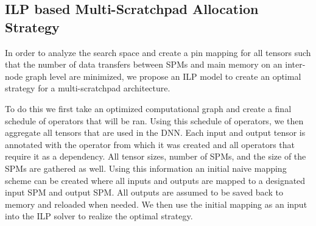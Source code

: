 \subsection{ILP based Multi-Scratchpad Allocation Strategy}
In order to analyze the search space and create a pin mapping for all tensors
such that the number of data transfers between SPMs and main memory on an
inter-node graph level are minimized, we propose an ILP model to create an
optimal strategy for a multi-scratchpad architecture.

To do this we first take an optimized computational graph and create a final
schedule of operators that will be ran. Using this schedule of operators, we
then aggregate all tensors that are used in the DNN. Each input and output
tensor is annotated with the operator from which it was created and all
operators that require it as a dependency. All tensor sizes, number of SPMs,
and the size of the SPMs are gathered as well. Using this information an
initial naive mapping scheme can be created where all inputs and outputs are
mapped to a designated input SPM and output SPM. All outputs are assumed to be
saved back to memory and reloaded when needed. We then use the initial mapping
as an input into the ILP solver to realize the optimal strategy.
